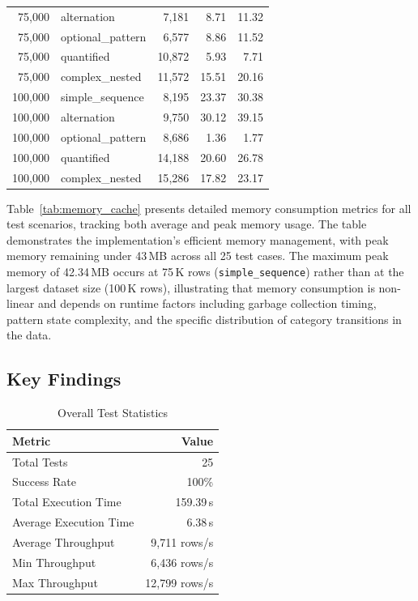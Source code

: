 {\begin{longtable}{@{\extracolsep{\fill}}rlrrr}
 75{,}000 & alternation       & 7{,}181 &  8.71 & 11.32 \\
 75{,}000 & optional\_pattern & 6{,}577 &  8.86 & 11.52 \\
 75{,}000 & quantified        & 10{,}872 &  5.93 &  7.71 \\
 75{,}000 & complex\_nested   & 11{,}572 & 15.51 & 20.16 \\
\midrule
100{,}000 & simple\_sequence  &  8{,}195 & 23.37 & 30.38 \\
100{,}000 & alternation       &  9{,}750 & 30.12 & 39.15 \\
100{,}000 & optional\_pattern &  8{,}686 &  1.36 &  1.77 \\
100{,}000 & quantified        & 14{,}188 & 20.60 & 26.78 \\
100{,}000 & complex\_nested   & 15{,}286 & 17.82 & 23.17 \\
\end{longtable}
}

Table~\ref{tab:memory_cache} presents detailed memory consumption
metrics for all test scenarios, tracking both average and peak memory
usage.  The table demonstrates the implementation's efficient memory
management, with peak memory remaining under 43\,MB across all 25
test cases.  The maximum peak memory of 42.34\,MB occurs at 75\,K
rows (\texttt{simple\_sequence}) rather than at the largest dataset
size (100\,K rows), illustrating that memory consumption is
non-linear and depends on runtime factors including garbage
collection timing, pattern state complexity, and the specific
distribution of category transitions in the data.

\subsection{Key Findings}
\label{subsec:eval-key-findings}

\begin{table}[H]
\centering
\caption{Overall Test Statistics}
\label{tab:overall_stats}
\begin{tabular}{lr}
\toprule
\textbf{Metric} & \textbf{Value} \\
\midrule
Total Tests             & 25 \\
Success Rate            & 100\% \\
Total Execution Time    & 159.39\,s \\
Average Execution Time  & 6.38\,s \\
Average Throughput      & 9{,}711 rows/s \\
Min Throughput          & 6{,}436 rows/s \\
Max Throughput          & 12{,}799 rows/s \\
\bottomrule
\end{tabular}
\end{table}

